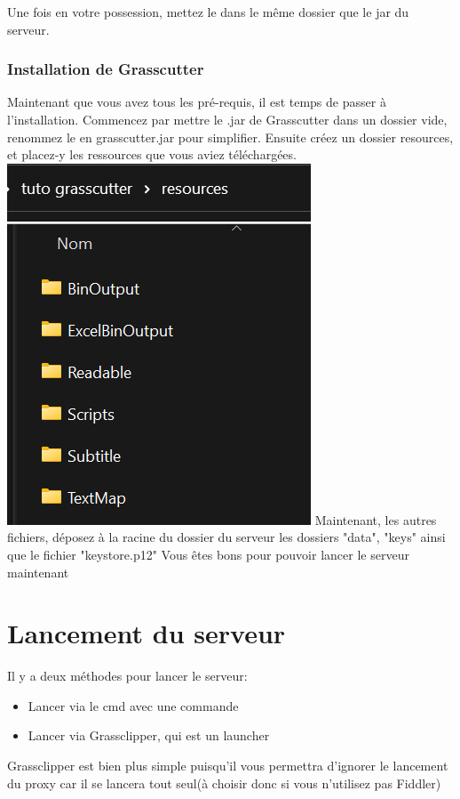 \documentclass{article}
\begin{document}
Une fois en votre possession, mettez le dans le même dossier que le jar du serveur.

\subsubsection{Installation de Grasscutter}
Maintenant que vous avez tous les pré-requis, il est temps de passer à l'installation.\newline
Commencez par mettre le .jar de Grasscutter dans un dossier vide, renommez le en grasscutter.jar pour simplifier.\newline
Ensuite créez un dossier resources, et placez-y les ressources que vous aviez téléchargées.\newline
\includegraphics[scale=1]{img/disp_resources.png}\newline
Maintenant, les autres fichiers, déposez à la racine du dossier du serveur les dossiers "data", "keys" ainsi que le fichier "keystore.p12"\newline
Vous êtes bons pour pouvoir lancer le serveur maintenant

\hrulefill

\section{Lancement du serveur}
Il y a deux méthodes pour lancer le serveur:
\begin{itemize}
	\item Lancer via le cmd avec une commande
	\item Lancer via Grassclipper, qui est un launcher
\end{itemize}
Grassclipper est bien plus simple puisqu'il vous permettra d'ignorer le lancement du proxy car il se lancera tout seul(à choisir donc si vous n'utilisez pas Fiddler)
\end{document}
